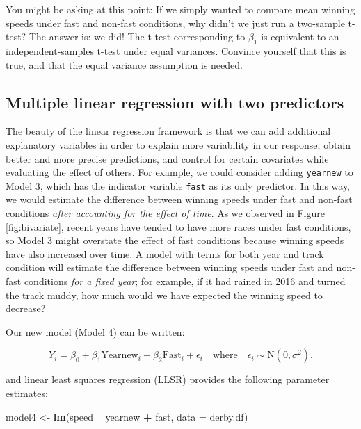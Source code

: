 \documentclass[
]{krantz}
\newenvironment{Shaded}{\begin{snugshade}}{\end{snugshade}}
\newcommand{\DataTypeTok}[1]{\textcolor[rgb]{0.27,0.27,0.27}{#1}}
\newcommand{\KeywordTok}[1]{\textcolor[rgb]{0.27,0.27,0.27}{\textbf{#1}}}
\newcommand{\NormalTok}[1]{#1}
\newcommand{\OperatorTok}[1]{\textcolor[rgb]{0.43,0.43,0.43}{\textbf{#1}}}
\newcommand{\StringTok}[1]{\textcolor[rgb]{0.5,0.5,0.5}{#1}}
\begin{document}
You might be asking at this point: If we simply wanted to compare mean winning speeds under fast and non-fast conditions, why didn't we just run a two-sample t-test? The answer is: we did! The t-test corresponding to \(\beta_{1}\) is equivalent to an independent-samples t-test under equal variances. Convince yourself that this is true, and that the equal variance assumption is needed.

\hypertarget{multiple-linear-regression-with-two-predictors}{%
\subsection{Multiple linear regression with two predictors}\label{multiple-linear-regression-with-two-predictors}}

The beauty of the linear regression framework is that we can add additional explanatory variables in order to explain more variability in our response, obtain better and more precise predictions, and control for certain covariates while evaluating the effect of others. For example, we could consider adding \texttt{yearnew} to Model 3, which has the indicator variable \texttt{fast} as its only predictor. In this way, we would estimate the difference between winning speeds under fast and non-fast conditions \emph{after accounting for the effect of time}. As we observed in Figure \ref{fig:bivariate}, recent years have tended to have more races under fast conditions, so Model 3 might overstate the effect of fast conditions because winning speeds have also increased over time. A model with terms for both year and track condition will estimate the difference between winning speeds under fast and non-fast conditions \emph{for a fixed year}; for example, if it had rained in 2016 and turned the track muddy, how much would we have expected the winning speed to decrease?

Our new model (Model 4) can be written:

\begin{equation}
Y_{i}=\beta_{0}+\beta_{1}\textrm{Yearnew}_{i}+\beta_{2}\textrm{Fast}_{i}+\epsilon_{i}\quad \textrm{where}\quad \epsilon_{i}\sim \textrm{N}(0,\sigma^2).
\label{eq:model4}
\end{equation}

and linear least squares regression (LLSR) provides the following parameter estimates:

\begin{Shaded}
\begin{Highlighting}[]
\NormalTok{model4 <-}\StringTok{ }\KeywordTok{lm}\NormalTok{(speed }\OperatorTok{~}\StringTok{ }\NormalTok{yearnew }\OperatorTok{+}\StringTok{ }\NormalTok{fast, }\DataTypeTok{data =}\NormalTok{ derby.df)}
\end{Highlighting}
\end{Shaded}
\end{document}
